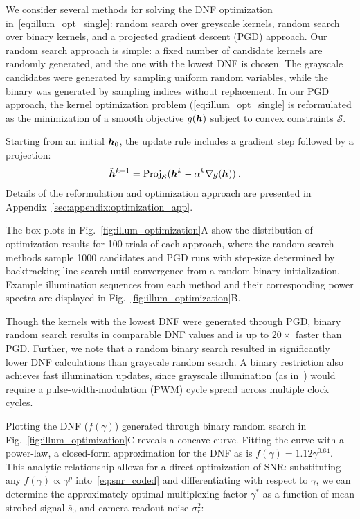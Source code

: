 We consider several methods for solving the DNF optimization in~\eqref{eq:illum_opt_single}: random search over greyscale kernels, random search over binary kernels, and a projected gradient descent (PGD) approach. Our random search approach is simple: a fixed number of candidate kernels are randomly generated, and the one with the lowest DNF is chosen. The grayscale candidates were generated by sampling uniform random variables, while the binary was generated by sampling indices without replacement. In our PGD approach, the kernel optimization problem (\eqref{eq:illum_opt_single} is reformulated as the minimization of a smooth objective $g(\bm{h})$ subject to convex constraints $\mathcal{S}$.

Starting from an initial $\bm{h}_0$, the update rule includes a gradient step followed by a projection:
\begin{align*}
    \tilde {\bm{h}}^{k+1} &= \mathrm{Proj}_{\mathcal{S}}(\bm{h}^k - \alpha^k \nabla g(\bm{h}))\:.
\end{align*}
Details of the reformulation and optimization approach are presented in Appendix~\ref{sec:appendix:optimization_app}.

The box plots in Fig.~\ref{fig:illum_optimization}A show the distribution of optimization results for 100 trials of each approach, where the random search methods sample 1000 candidates and PGD runs with step-size determined by backtracking line search until convergence from a random binary initialization. Example illumination sequences from each method and their corresponding power spectra are displayed in Fig.~\ref{fig:illum_optimization}B.

Though the kernels with the lowest DNF were generated through PGD, binary random search results in comparable DNF values and is up to $20\times$ faster than PGD. Further, we note that a random binary search resulted in significantly lower DNF calculations than grayscale random search. A binary restriction also achieves fast illumination updates, since grayscale illumination (as in~\cite{Ma:15}) would require a pulse-width-modulation (PWM) cycle spread across multiple clock cycles.

Plotting the DNF ($f(\gamma)$) generated through binary random search in Fig.~\ref{fig:illum_optimization}C reveals a concave curve. Fitting the curve with a power-law, a closed-form approximation for the DNF as is $f(\gamma)=1.12\gamma^{0.64}$. This analytic relationship allows for a direct optimization of SNR: substituting any $f(\gamma) \propto \gamma^p$ into~\eqref{eq:snr_coded} and differentiating with respect to $\gamma$, we can determine the approximately optimal multiplexing factor $\gamma^*$ as a function of mean strobed signal $\bar{s}_0$ and camera readout noise $\sigma_r^2$:

